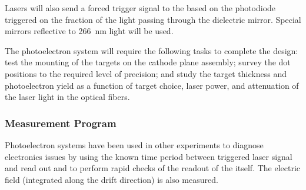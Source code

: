 

Lasers will also send a forced trigger signal to the  based on the photodiode triggered on the fraction of the light passing through the dielectric mirror. Special mirrors reflective to \SI{266}{\nano\m} light will be used. 

The photoelectron system will require the following tasks to complete the design: test the mounting of the targets on the cathode plane assembly; survey the dot positions to the required level of precision; and study the target thickness and photoelectron yield as a function of target choice, laser power, and attenuation of the laser light in the optical fibers.


\subsubsection{Measurement Program}
\label{sec:sp-calib-sys-las-pe-meas}

Photoelectron systems have been used in other experiments to diagnose electronics issues by using the known time period between triggered laser signal and read out and to perform rapid checks of the readout of the  itself. The electric field (integrated along the drift direction) is also measured.
